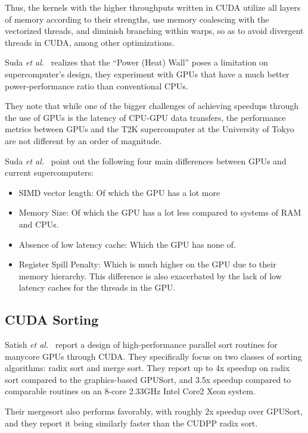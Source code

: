 Thus, the kernels with the higher throughputs written in CUDA utilize all layers of memory according to their strengths, use memory coalescing with the vectorized threads, and diminish branching within warps, so as to avoid divergent threads in CUDA, among other optimizations.

Suda \textit{et al.}~\cite{Suda:2009:AGG:1509633.1509696} realizes that the ``Power (Heat) Wall'' poses a limitation on supercomputer's design, they experiment with GPUs that have a much better power-performance ratio than conventional CPUs.

They note that while one of the bigger challenges of achieving speedups through the use of GPUs is the latency of CPU-GPU data transfers, the performance metrics between GPUs and the T2K supercomputer at the University of Tokyo are not different by an order of magnitude.

Suda \textit{et al.}~\cite{Suda:2009:AGG:1509633.1509696} point out the following four main differences between GPUs and current supercomputers:
\begin{itemize}
    \item{SIMD vector length:}
    Of which the GPU has a lot more
    \item{Memory Size:}
    Of which the GPU has a lot less compared to systems of RAM and CPUs.
    \item{Absence of low latency cache:}
    Which the GPU has none of.
    \item{Register Spill Penalty:}
    Which is much higher on the GPU due to their memory hierarchy.
    This difference is also exacerbated by the lack of low latency caches for the threads in the GPU.
\end{itemize}

\subsection{CUDA Sorting}


Satish \textit{et al.}~\cite{Satish:2009:DES:1586640.1587667} report a design of high-performance parallel sort routines for manycore GPUs through CUDA.
They specifically focus on two classes of sorting algorithms: radix sort and merge sort.
They report up to 4x speedup on radix sort compared to the graphics-based GPUSort, and 3.5x speedup compared to comparable routines on an 8-core 2.33GHz Intel Core2 Xeon system.

Their mergesort also performs favorably, with roughly 2x speedup over GPUSort, and they report it being similarly faster than the CUDPP radix sort.

